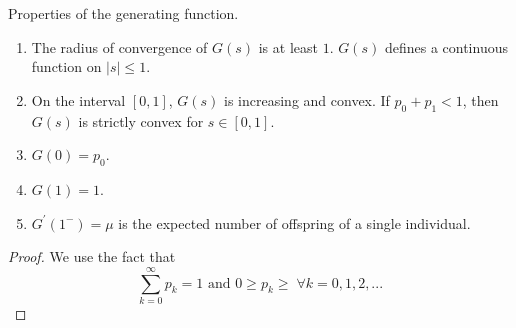 	\begin{theorem}[Properties]
		\label{thm:properties}
		Properties of the generating function. 
		\begin{enumerate}
			\item The radius of convergence of $G(s)$ is at least $1$. $G(s)$ defines a continuous function on $|s| \leq 1$. 
			\item On the interval $[0,1]$, $G(s)$ is increasing and convex. If $p_0 + p_1 < 1$, then $G(s)$ is strictly convex for $s \in [0,1]$. 
			\item $G(0) = p_0$. 
			\item $G(1) = 1$. 
			\item $G^\prime(1^-) = \mu$ is the expected number of offspring of a single individual. 
		\end{enumerate}
	\end{theorem}
	\begin{proof}
		We use the fact that 
		\begin{equation}
			\sum_{k=0}^\infty p_k = 1 \text{ and } 0 \geq p_k \geq \; \forall k = 0, 1, 2, ...
		\end{equation}
	\end{proof}

